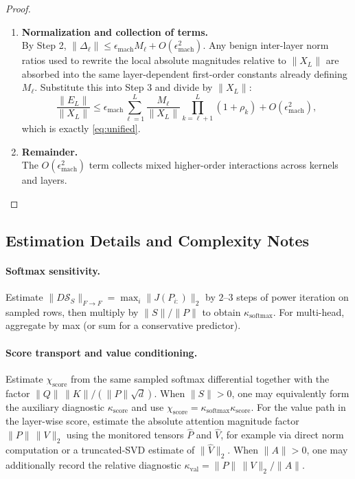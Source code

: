 \documentclass[twoside]{article}
\theoremstyle{definition}
\theoremstyle{remark}
\begin{document}
\begin{proof}
\begin{enumerate}
  \item \textbf{Normalization and collection of terms.}\\
  By Step 2, $\|\Delta_\ell\|\le \epsilon_{\mathrm{mach}} M_\ell + O(\epsilon_{\mathrm{mach}}^2)$.
  Any benign inter-layer norm ratios used to rewrite the local absolute
  magnitudes relative to $\|X_L\|$ are absorbed into the same layer-dependent
  first-order constants already defining $M_\ell$.
  Substitute this into Step 3 and divide by $\|X_L\|$:
  \[
  \frac{\|E_L\|}{\|X_L\|}
  \le
  \epsilon_{\mathrm{mach}}
  \sum_{\ell=1}^{L}
  \frac{M_\ell}{\|X_L\|}
  \prod_{k=\ell+1}^{L}(1+\rho_k)
  +
  O(\epsilon_{\mathrm{mach}}^2),
  \]
  which is exactly \eqref{eq:unified}.

  \item \textbf{Remainder.}\\
  The $O(\epsilon_{\mathrm{mach}}^2)$ term collects mixed higher-order interactions across kernels and layers.
\end{enumerate}
\end{proof}

\subsection{Estimation Details and Complexity Notes}
\label{app:estimation}

\paragraph{Softmax sensitivity.}
Estimate $\|D\mathcal{S}_S\|_{F\to F}=\max_i\|J(P_{i:})\|_2$ by $2$--$3$ steps of power iteration on sampled rows, then multiply by $\|S\|/\|P\|$ to obtain $\kappa_{\mathrm{softmax}}$. For multi-head, aggregate by max (or sum for a conservative predictor).

\paragraph{Score transport and value conditioning.}
Estimate $\chi_{\mathrm{score}}$ from the same sampled softmax differential together with the factor $\|Q\|\,\|K\|/(\|P\|\sqrt d)$. When $\|S\|>0$, one may equivalently form the auxiliary diagnostic $\kappa_{\mathrm{score}}$ and use $\chi_{\mathrm{score}}=\kappa_{\mathrm{softmax}}\kappa_{\mathrm{score}}$. For the value path in the layer-wise score, estimate the absolute attention magnitude factor $\|P\|\,\|V\|_2$ using the monitored tensors $\widehat{P}$ and $\widehat{V}$, for example via direct norm computation or a truncated-SVD estimate of $\|\widehat{V}\|_2$. When $\|A\|>0$, one may additionally record the relative diagnostic $\kappa_{\mathrm{val}}=\|P\|\,\|V\|_2/\|A\|$.
\end{document}
